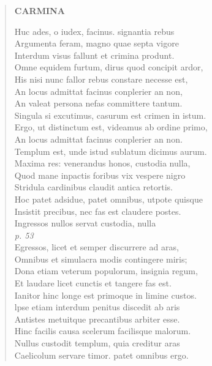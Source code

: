 \documentclass[11pt, a4paper]{report}
\begin{document}
\begin{verse}
    \begin{center} \textbf{CARMINA} \end{center} \marginpar{[90]} Huc ades,  \lbrack o \rbrack  iudex, facinus. signantia rebus \\ Argumenta feram, magno quae septa vigore \\ Interdum visus fallunt et crimina produnt. \\ Omne equidem furtum, dirus quod concipit ardor, \\ His nisi nunc fallor rebus constare necesse est, \\ An locus admittat facinus conplerier an non, \\ An valeat persona nefas committere tantum. \\ Singula si excutimus, casurum est crimen in istum. \\ Ergo, ut distinctum est, videamus ab ordine primo, \\ An locus admittat facinus conplerier an non. \\ Templum est, unde istud sublatum dicimus aurum. \\ Maxima res: venerandus honos, custodia nulla, \\ Quod mane inpactis foribus vix vespere nigro \\ Stridula cardinibus claudit antica retortis. \\ Hoc patet adsidue, patet omnibus, utpote quisque \\ Insistit precibus, nec fas est claudere postes. \\ Ingressos nullos servat custodia, nulla \\ \textit{p. 53} \\ Egressos, licet  \lbrack et \rbrack  semper discurrere ad aras, \\ Omnibus et simulacra modis contingere miris; \\ Dona etiam veterum populorum, insignia regum, \\ Et laudare licet cunctis et tangere fas est. \\ Ianitor hinc longe est primoque in limine custos. \\ lpse etiam interdum penitus discedit ab aris \\ Antistes metuitque precantibus arbiter esse. \\ Hinc facilis causa scelerum facilisque malorum. \\ Nullus custodit templum, quia creditur aras \\ Caelicolum servare timor. patet omnibus ergo. \\ 

\end{verse}
\end{document}
